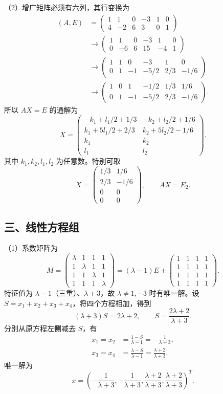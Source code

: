 \documentclass[11pt,fontset=fandol]{ctexart}
\begin{document}
（2）增广矩阵必须有六列，其行变换为 \[
\begin{aligned}
(A,E)&=\left(\begin{array}{rrrr|rr}1&1&0&-3&1&0\\4&-2&6&3&0&1\end{array}\right)\\
&\longrightarrow\left(\begin{array}{rrrr|rr}1&1&0&-3&1&0\\0&-6&6&15&-4&1\end{array}\right)\\
&\longrightarrow\left(\begin{array}{rrrr|rr}1&1&0&-3&1&0\\0&1&-1&-5/2&2/3&-1/6\end{array}\right)\\
&\longrightarrow\left(\begin{array}{rrrr|rr}1&0&1&-1/2&1/3&1/6\\0&1&-1&-5/2&2/3&-1/6\end{array}\right).
\end{aligned}
\] 所以 \(AX=E\) 的通解为 \[
X=\begin{pmatrix}
-k_1+l_1/2+1/3&-k_2+l_2/2+1/6\\
k_1+5l_1/2+2/3&k_2+5l_2/2-1/6\\
k_1&k_2\\l_1&l_2
\end{pmatrix}.
\] 其中 \(k_1,k_2,l_1,l_2\) 为任意数。特别可取 \[
X=\begin{pmatrix}1/3&1/6\\2/3&-1/6\\0&0\\0&0\end{pmatrix},\qquad AX=E_2.
\]

\subsection{三、线性方程组}\label{ux4e09ux7ebfux6027ux65b9ux7a0bux7ec4}

（1）系数矩阵为 \[
M=\begin{pmatrix}\lambda&1&1&1\\1&\lambda&1&1\\1&1&\lambda&1\\1&1&1&\lambda\end{pmatrix}
=(\lambda-1)E+\begin{pmatrix}1&1&1&1\\1&1&1&1\\1&1&1&1\\1&1&1&1\end{pmatrix}.
\] 特征值为 \(\lambda-1\)（三重）、\(\lambda+3\)，故 \(\lambda\ne1,-3\)
时有唯一解。设 \(S=x_1+x_2+x_3+x_4\)，将四个方程相加，得到 \[
(\lambda+3)S=2\lambda+2,\qquad S=\frac{2\lambda+2}{\lambda+3}.
\] 分别从原方程左侧减去 \(S\)，有 \[
\begin{aligned}
x_1=x_2&=\frac{1-S}{\lambda-1}=-\frac1{\lambda+3},\\
x_3=x_4&=\frac{\lambda-S}{\lambda-1}=\frac{\lambda+2}{\lambda+3}.
\end{aligned}
\] 唯一解为 \[
x=\left(-\frac1{\lambda+3},-\frac1{\lambda+3},\frac{\lambda+2}{\lambda+3},\frac{\lambda+2}{\lambda+3}\right)^T.
\]
\end{document}
